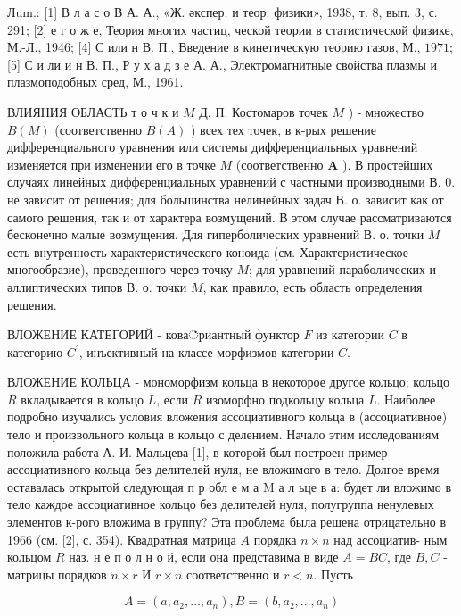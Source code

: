 \documentclass[10pt]{article}
\begin{document}
Лum.: [1] В л а с о В А. А., «Ж. әкспер. и теор. физики», 1938, т. 8, вып. 3, с. 291; [2] е г о ж е, Теория многих частиц, ческой теории в статистической физике, М.-Л., 1946; [4] С или н В. П., Введение в кинетическую теорию газов, М., $1971 ;$ [5] С и ли и н В. П., Р у х а д з е А. А., Электромагнитные свойства плазмы и плазмоподобных сред, М., 1961.



ВЛИЯНИЯ ОБЛАСТЬ т о ч к и $M$ Д. П. Костомаров точек $M$ ) - множество $B(M)$ (соответственно $B(A)$ ) всех тех точек, в к-рых решение дифференциального уравнения или системы дифференциальных уравнений изменяется при изменении его в точке $M$ (соответственно $\boldsymbol{A}$ ). В простейших случаях линейных дифференциальных уравнений с частными производными В. 0. не зависит от решения; для большинства нелинейных задач В. о. зависит как от самого решения, так и от характера возмущений. В этом случае рассматриваются бесконечно малые возмущения. Для гиперболических уравнений В. о. точки $M$ есть внутренность характеристического коноида (см. Характеристическое многообразие), проведенного через точку $M$; для уравнений параболических и әллиптических типов В. о. точки $M$, как правило, есть область определения решения.



ВЛОЖЕНИЕ КАТЕГОРИЙ - кова்риантный функтор $F$ из категории $C$ в категорию $C^{\prime}$, инъективный на классе морфизмов категории $C$.



ВЛОЖЕНИЕ КОЛЬЦА - мономорфизм кольца в некоторое другое кольцо; кольцо $R$ вкладывается в кольцо $L$, если $R$ изоморфно подкольцу кольца $L$. Наиболее подробно изучались условия вложения ассоциативного кольца в (ассоциативное) тело и произвольного кольца в кольцо с делением. Начало этим исследованиям положила работа А. И. Мальцева [1], в которой был построен пример ассоциативного кольца без делителей нуля, не вложимого в тело. Долгое время оставалась открытой следующая п р обл е м а M а л ьце в а: будет ли вложимо в тело каждое ассоциативное кольцо без делителей нуля, полугруппа ненулевых элементов к-рого вложима в группу? Эта проблема была решена отрицательно в 1966 (см. [2], с. 354). Квадратная матрица $A$ порядка $n \times n$ над ассоциатив- ным кольцом $R$ наз. н е п о л н о й, если она представима в виде $A=B C$, где $B, C$ - матрицы порядков $n \times r$ И $r \times n$ соответственно и $r<n$. Пусть



\[

A=\left(a, a_{2}, \ldots, a_{n}\right), B=\left(b, a_{2}, \ldots, a_{n}\right)

\]
\end{document}
